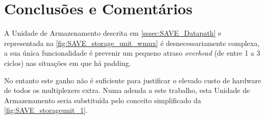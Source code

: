 \documentclass[a4paper]{article}
\begin{document}





\section{Conclusões e Comentários}

A Unidade de Armazenamento descrita em \ref{sssec:SAVE_Datapath} e representada na \autoref{fig:SAVE_storage_unit_wmux} é desnecessariamente complexa, a sua única funcionalidade é prevenir um pequeno atraso \textit{overhead} (de entre 1 a 3 ciclos) nas situações em que há padding.

No entanto este ganho não é suficiente para justificar o elevado custo de hardware de todos os multiplexers extra. Numa adenda a este trabalho, esta Unidade de Armazenamento seria substituída pelo conceito simplificado da \autoref{fig:SAVE_storageunit_1}.
\end{document}
